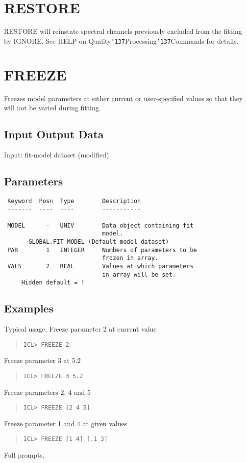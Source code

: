 \documentclass{book}
\renewcommand{\_}{{\tt\char'137}}     %
\begin{document}
\section{RESTORE}
RESTORE will reinstate spectral channels previously excluded from
the fitting by IGNORE.
See HELP on Quality\_Processing\_Commands for details.
\section{FREEZE}
Freezes model parameters at either current or user-specified
values so that they will not be varied during fitting.
\subsection{Input Output Data}
Input: fit-model dataset (modified)
\subsection{Parameters}
\begin{verbatim}
 Keyword  Posn  Type        Description
 -------  ----  ----        -----------

 MODEL      -   UNIV        Data object containing fit
                            model.
       GLOBAL.FIT_MODEL (Default model dataset)
 PAR        1   INTEGER     Numbers of parameters to be
                            frozen in array.
 VALS       2   REAL        Values at which parameters
                            in array will be set.
     Hidden default = !

\end{verbatim}\subsection{Examples}
Typical usage. Freeze parameter 2 at current value
\begin{quote}\begin{verbatim}
ICL> FREEZE 2
\end{verbatim}\end{quote}
Freeze parameter 3 at 5.2
\begin{quote}\begin{verbatim}
ICL> FREEZE 3 5.2
\end{verbatim}\end{quote}
Freeze parameters 2, 4 and 5
\begin{quote}\begin{verbatim}
ICL> FREEZE [2 4 5]
\end{verbatim}\end{quote}
Freeze parameter 1 and 4 at given values
\begin{quote}\begin{verbatim}
ICL> FREEZE [1 4] [.1 3]
\end{verbatim}\end{quote}
Full prompts,
\end{document}
